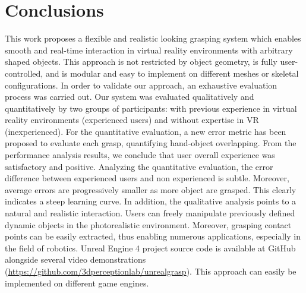 \section{Conclusions}
\label{sec:conclusion}
This work proposes a flexible and realistic looking grasping system which enables smooth and real-time interaction in virtual reality environments with arbitrary shaped objects. This approach is not restricted by object geometry, is fully user-controlled, and is modular and easy to implement on different meshes or skeletal configurations. In order to validate our approach, an exhaustive evaluation process was carried out. Our system was evaluated qualitatively and quantitatively by two groups of participants: with previous experience in virtual reality environments (experienced users) and without expertise in VR (inexperienced). For the quantitative evaluation, a new error metric has been proposed to evaluate each grasp, quantifying hand-object overlapping. From the performance analysis results, we conclude that user overall experience was satisfactory and positive. Analyzing the quantitative evaluation, the error difference between experienced users and non experienced is subtle. Moreover, average errors are progressively smaller as more object are grasped. This clearly indicates a steep learning curve. In addition, the qualitative analysis points to a natural and realistic interaction. Users can freely manipulate previously defined dynamic objects in the photorealistic environment. Moreover, grasping contact points can be easily extracted, thus enabling numerous applications, especially in the field of robotics. Unreal Engine 4 project source code is available at GitHub alongside several video demonstrations (\url{https://github.com/3dperceptionlab/unrealgrasp}). This approach can easily be implemented on different game engines.